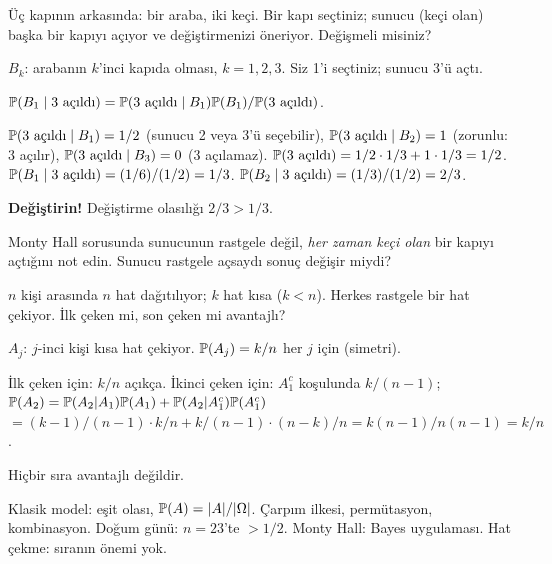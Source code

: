 \begin{ornek}\label{ex:montyhall}
Üç kapının arkasında: bir araba, iki keçi. Bir kapı seçtiniz; sunucu (keçi
olan) başka bir kapıyı açıyor ve değiştirmenizi öneriyor. Değişmeli misiniz?

$B_k$: arabanın $k$'inci kapıda olması, $k=1,2,3$.
Siz 1'i seçtiniz; sunucu 3'ü açtı.

$\mathbb{P}(B_1 \mid \text{3 açıldı}) = \mathbb{P}(\text{3 açıldı} \mid B_1)\mathbb{P}(B_1) / \mathbb{P}(\text{3 açıldı})$.

$\mathbb{P}(\text{3 açıldı} \mid B_1) = 1/2$ (sunucu 2 veya 3'ü seçebilir),
$\mathbb{P}(\text{3 açıldı} \mid B_2) = 1$ (zorunlu: 3 açılır),
$\mathbb{P}(\text{3 açıldı} \mid B_3) = 0$ (3 açılamaz).
$\mathbb{P}(\text{3 açıldı}) = 1/2 \cdot 1/3 + 1 \cdot 1/3 = 1/2$.
$\mathbb{P}(B_1 \mid \text{3 açıldı}) = (1/6)/(1/2) = 1/3$.
$\mathbb{P}(B_2 \mid \text{3 açıldı}) = (1/3)/(1/2) = 2/3$.

\textbf{Değiştirin!} Değiştirme olasılığı $2/3 > 1/3$.
\end{ornek}

\begin{kendinleifade}
Monty Hall sorusunda sunucunun rastgele değil, \emph{her zaman keçi olan}
bir kapıyı açtığını not edin. Sunucu rastgele açsaydı sonuç değişir miydi?
\end{kendinleifade}

\begin{ornek}\label{ex:hatchekme}
$n$ kişi arasında $n$ hat dağıtılıyor; $k$ hat kısa ($k < n$). Herkes
rastgele bir hat çekiyor. İlk çeken mi, son çeken mi avantajlı?

$A_j$: $j$-inci kişi kısa hat çekiyor.
$\mathbb{P}(A_j) = k/n$ her $j$ için (simetri).

İlk çeken için: $k/n$ açıkça.
İkinci çeken için: $A_1^c$ koşulunda $k/(n-1)$;
$\mathbb{P}(A_2) = \mathbb{P}(A_2|A_1)\mathbb{P}(A_1) + \mathbb{P}(A_2|A_1^c)\mathbb{P}(A_1^c)$
$= (k-1)/(n-1) \cdot k/n + k/(n-1) \cdot (n-k)/n = k(n-1)/n(n-1) = k/n$.

Hiçbir sıra avantajlı değildir.
\end{ornek}

\begin{mikroozet}[§2.6 özeti]
Klasik model: eşit olası, $\mathbb{P}(A) = |A|/|\Omega|$. Çarpım ilkesi, permütasyon,
kombinasyon. Doğum günü: $n=23$'te $>1/2$. Monty Hall: Bayes uygulaması.
Hat çekme: sıranın önemi yok.
\end{mikroozet}


